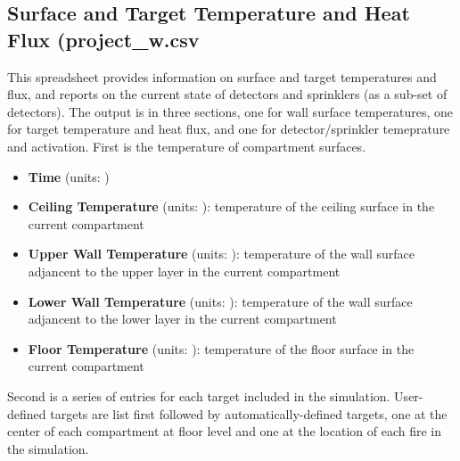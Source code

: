 \subsection{Surface and Target Temperature and Heat Flux (project\_w.csv}

This spreadsheet provides information on surface and target temperatures and flux, and reports on the current state of detectors and sprinklers (as a sub-set of detectors). The output is in three sections, one for wall surface temperatures, one for target temperature and heat flux, and one for detector/sprinkler temeprature and activation. First is the temperature of compartment surfaces.

\begin{itemize}
\item \textbf{Time} (units: \degc)
\item \textbf{Ceiling Temperature} (units: \degc): temperature of the ceiling surface in the current compartment
\item \textbf{Upper Wall Temperature} (units: \degc): temperature of the wall surface adjancent to the upper layer in the current compartment
\item \textbf{Lower Wall Temperature} (units: \degc): temperature of the  wall surface adjancent to the lower layer in the current compartment
\item \textbf{Floor Temperature} (units: \degc): temperature of the floor surface in the current compartment
\end{itemize}

Second is a series of entries for each target included in the simulation.  User-defined targets are list first followed by automatically-defined targets, one at the center of each compartment at floor level and one at the location of each fire in the simulation.

